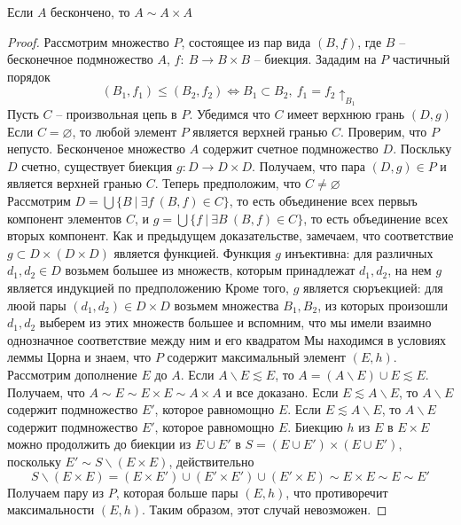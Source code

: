 \begin{lem}
Если $A$ бескончено, то $A \sim A \times A$
\end{lem}
\begin{proof}
Рассмотрим множество $P$, состоящее из пар вида $(B,f)$, где $B$ -- бесконечное подмножество $A$, $f:\ B \to B \times B$ -- биекция. Зададим на $P$ частичный порядок 
$$
(B_1, f_1) \leqslant (B_2, f_2) \Leftrightarrow B_1 \subset B_2,\ f_1 = f_2 \uparrow_{B_1}
$$
Пусть $C$ -- произвольная цепь в $P$. Убедимся что $C$ имеет верхнюю грань $(D,g)$\\
Если $C = \varnothing$, то любой элемент $P$ является верхней гранью $C$. Проверим, что $P$ непусто. Бесконченое множество $A$ содержит счетное подмножество $D$. Поскльку $D$ счетно, существует биекция $g: D \to D \times D$. Получаем, что пара $(D,g) \in P$ и является верхней гранью $C$.
\vskip 0.1in
Теперь предположим, что $C \ne \varnothing$\\
Рассмотрим $D = \bigcup\{B\ |\ \exists f\ (B,f) \in C\}$, то есть объединение всех первыъ компонент элементов $C$, и $g = \bigcup\{f\ |\ \exists B\ (B,f) \in C\}$, то есть объединение всех вторых компонент.
\vskip 0.1in
Как и предыдущем доказательстве, замечаем, что соответствие $g \subset D \times (D \times D)$ является функцией.
\vskip 0.1in
Функция $g$ инъективна: для различных $d_1, d_2 \in D$ возьмем большее из множеств, которым принадлежат $d_1, d_2$, на нем $g$ является индукцией по предположению
\vskip 0.1in
Кроме того, $g$ является сюръекцией: для люой пары $(d_1,d_2) \in D \times D$ возьмем множества $B_1, B_2$, из которых произошли $d_1, d_2$ выберем из этих множеств большее и вспомним, что мы имели взаимно однозначное соответствие между ним и его квадратом
\vskip 0.1in
Мы находимся в условиях леммы Цорна и знаем, что $P$ содержит максимальный элемент $(E,h)$.
\vskip 0.1in
Рассмотрим дополнение $E$ до $A$. Если $A \backslash E \lesssim E$, то $A = (A \backslash E) \cup E \lesssim E$. Получаем, что $A \sim E \sim E \times E \sim A \times A$ и все доказано.
\vskip 0.1in
Если $E \lesssim A \backslash E$, то $A \backslash E$ содержит подмножество $E'$, которое равномощно $E$.
\vskip 0.1in
Если $E \lesssim A \backslash E$, то $A \backslash E$ содержит подмножество $E'$, которое равномощно $E$. 
\vskip 0.1in
Биекцию $h$ из $E$ в $E \times E$ можно продолжить до биекции из $E \cup E'$ в $S = (E \cup E') \times (E \cup E')$, поскольку $E' \sim S \backslash (E \times E)$, действительно
$$
S \backslash (E \times E) = (E \times E') \cup (E'\times E') \cup (E'\times E) \sim E \times E \sim E \sim E'
$$
Получаем пару из $P$, которая больше пары $(E,h)$, что противоречит максимальности $(E,h)$. Таким образом, этот случай невозможен.
\end{proof}

